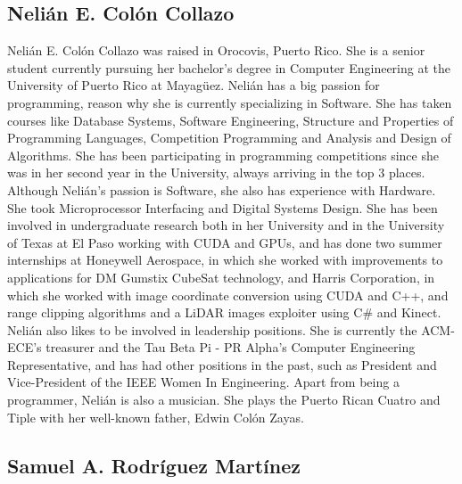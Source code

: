\label{sec:bios}

\subsection*{Nelián E. Colón Collazo}

Nelián E. Colón Collazo was raised in Orocovis, Puerto Rico. She is a senior
student currently pursuing her bachelor's degree in Computer Engineering at the
University of Puerto Rico at Mayagüez. Nelián has a big passion for programming,
reason why she is currently specializing in Software. She has taken courses like
Database Systems, Software Engineering, Structure and Properties of  Programming
Languages, Competition Programming and Analysis and  Design of Algorithms. She
has been participating in programming competitions  since she was in her second
year in the University, always arriving in the top  3 places. Although Nelián's
passion is Software, she also has experience  with Hardware. She took
Microprocessor Interfacing and Digital Systems Design.  She has been involved in
undergraduate research both in her University  and in the University of Texas at
El Paso working with CUDA and GPUs,  and has done two summer internships at
Honeywell Aerospace, in which she worked  with improvements to applications for
DM Gumstix CubeSat technology,  and Harris Corporation, in which she worked with
image coordinate conversion  using CUDA and C++, and range clipping algorithms
and a LiDAR images exploiter  using C\# and Kinect. Nelián also likes to be
involved in leadership positions.  She is currently the ACM-ECE's treasurer and
the Tau Beta Pi - PR Alpha's  Computer Engineering Representative, and has had
other positions in the past, such as President and Vice-President of the IEEE
Women In Engineering. Apart from being  a programmer, Nelián is also a musician.
She plays the Puerto Rican Cuatro and Tiple  with her well-known father, Edwin
Colón Zayas.

\subsection*{Samuel A. Rodríguez Martínez}

